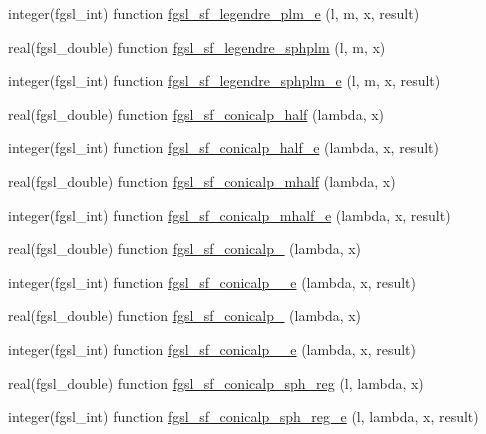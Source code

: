 \begin{DoxyCompactItemize}
\item 
integer(fgsl\+\_\+int) function \hyperlink{specfunc_8finc_a11383b00066d2ced2e3524326b1d5c80}{fgsl\+\_\+sf\+\_\+legendre\+\_\+plm\+\_\+e} (l, m, x, result)
\item 
real(fgsl\+\_\+double) function \hyperlink{specfunc_8finc_a98af4aba68beb6b6f9630db934f6e003}{fgsl\+\_\+sf\+\_\+legendre\+\_\+sphplm} (l, m, x)
\item 
integer(fgsl\+\_\+int) function \hyperlink{specfunc_8finc_a1cba953d6b10e13eda8a407fb8025a6f}{fgsl\+\_\+sf\+\_\+legendre\+\_\+sphplm\+\_\+e} (l, m, x, result)
\item 
real(fgsl\+\_\+double) function \hyperlink{specfunc_8finc_af47a6418398d7e389d60906572c597fc}{fgsl\+\_\+sf\+\_\+conicalp\+\_\+half} (lambda, x)
\item 
integer(fgsl\+\_\+int) function \hyperlink{specfunc_8finc_a7b02a030c69d177bd52361b67c7356bf}{fgsl\+\_\+sf\+\_\+conicalp\+\_\+half\+\_\+e} (lambda, x, result)
\item 
real(fgsl\+\_\+double) function \hyperlink{specfunc_8finc_a2b7fae81306ac8f6f1fcc41cdf972236}{fgsl\+\_\+sf\+\_\+conicalp\+\_\+mhalf} (lambda, x)
\item 
integer(fgsl\+\_\+int) function \hyperlink{specfunc_8finc_a86b8b852607f9dc665b1fef86dd7aba5}{fgsl\+\_\+sf\+\_\+conicalp\+\_\+mhalf\+\_\+e} (lambda, x, result)
\item 
real(fgsl\+\_\+double) function \hyperlink{specfunc_8finc_a7475f8415e567c47f5791cb480304c4d}{fgsl\+\_\+sf\+\_\+conicalp\+\_} (lambda, x)
\item 
integer(fgsl\+\_\+int) function \hyperlink{specfunc_8finc_a97d7773d6e9d7a5a20b85623107240fe}{fgsl\+\_\+sf\+\_\+conicalp\+\_\+\_\+e} (lambda, x, result)
\item 
real(fgsl\+\_\+double) function \hyperlink{specfunc_8finc_a3bb680614906528c022e197c2b0b7318}{fgsl\+\_\+sf\+\_\+conicalp\+\_} (lambda, x)
\item 
integer(fgsl\+\_\+int) function \hyperlink{specfunc_8finc_ab62ce997d158de5d7a9d518483208556}{fgsl\+\_\+sf\+\_\+conicalp\+\_\+\_\+e} (lambda, x, result)
\item 
real(fgsl\+\_\+double) function \hyperlink{specfunc_8finc_a11c52aac96d22334585ea7b6fd29fcd9}{fgsl\+\_\+sf\+\_\+conicalp\+\_\+sph\+\_\+reg} (l, lambda, x)
\item 
integer(fgsl\+\_\+int) function \hyperlink{specfunc_8finc_a903c76a10015fa1a0abf142afc033ac3}{fgsl\+\_\+sf\+\_\+conicalp\+\_\+sph\+\_\+reg\+\_\+e} (l, lambda, x, result)
\item 

\end{DoxyCompactItemize}
